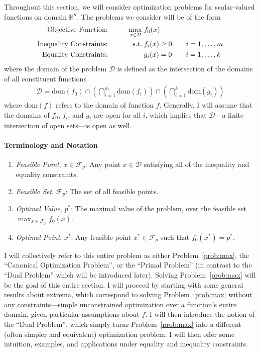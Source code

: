 \documentclass[12pt]{article}
\numberwithin{equation}{section} %
\theoremstyle{plain}
\theoremstyle{definition}
\theoremstyle{remark}
\newcommand{\dom}{\text{dom}}
\newcommand{\Rn}{\mathbb{R}^n}
\begin{document}
Throughout this section, we will consider optimization problems for
scalar-valued functions on domain $\Rn$. The problems we consider will
be of the form
\begin{alignat}{3}
  \text{Objective Function:} \qquad
    && \max_{x\in\mathcal{D}} \; &f_0(x) \label{prob:max}\\
  \text{Inequality Constraints:} \qquad
    && \text{s.t.} \; &f_i(x) \geq 0 \qquad i = 1,\ldots, m\notag \\
  \text{Equality Constraints:} \qquad
    && &g_i(x) = 0 \qquad i = 1,\ldots,k\notag
\end{alignat}
where the domain of the problem $\mathcal{D}$ is defined as the
intersection of the domains of all constituent functions
\begin{align*}
  \mathcal{D} = \dom(f_0)
  \cap \left( \bigcap^m_{i=1} \dom(f_i)\right)
  \cap \left( \bigcap^k_{i=1} \dom(g_i)\right)
\end{align*}
where $\dom(f)$ refers to the domain of function $f$. Generally, I will
assume that the domains of $f_0$, $f_i$, and $g_i$ are open for all $i$,
which implies that $\mathcal{D}$---a finite intersection of open
sets---is open as well.

\paragraph{Terminology and Notation}
\begin{enumerate}
  \item \emph{Feasible Point}, $x\in\mathscr{F}_p$: Any point
    $x\in\mathcal{D}$ satisfying all of the inequality and equality
    constraints.
  \item \emph{Feasible Set}, $\mathscr{F}_p$: The set of all feasible
    points.
  \item \emph{Optimal Value}, $p^*$: The maximal value of the problem,
    over the feasible set $\max_{x\in \mathscr{F}_p} f_0(x)$.
  \item \emph{Optimal Point}, $x^*$: Any feasible point
    $x^*\in\mathscr{F}_p$ such that $f_0(x^*)=p^*$.
\end{enumerate}
I will collectively refer to this entire problem as either
Problem~\ref{prob:max}, the ``Canonical Optimization Problem'', or the
``Primal Problem'' (in contrast to the ``Dual Problem'' which will be
introduced later). Solving Problem~\ref{prob:max} will be the goal of
this entire section. I will proceed by starting with some general
results about extrema, which correspond to solving
Problem~\ref{prob:max} without any constraints---simple unconstrained
optimization over a function's entire domain, given particular
assumptions about $f$. I will then introduce the notion of the ``Dual
Problem'', which simply turns Problem~\ref{prob:max} into a different
(often simpler and equivalent) optimization problem. I will then offer
some intuition, examples, and applications under equality and inequality
constraints.
\end{document}
